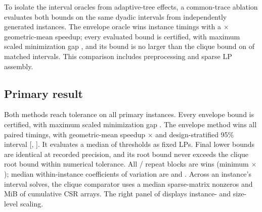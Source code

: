 \documentclass[11pt]{article}
\theoremstyle{plain}
\theoremstyle{definition}
\theoremstyle{remark}
\begin{document}
To isolate the interval oracles from adaptive-tree effects, a common-trace ablation evaluates both bounds on the same \PubTraceIntervals{} dyadic intervals from \PubTraceCases{} independently generated instances.  The envelope oracle wins \PubTraceWins{} instance timings with a \PubTraceGeoSpeedup$\times$ geometric-mean speedup; every evaluated bound is certified, with maximum scaled minimization gap \PubTraceCertGap, and its bound is no larger than the clique bound on \PubTraceDominancePct{} of matched intervals.  This comparison includes preprocessing and sparse LP assembly.

\begin{table}[t]
\centering
\caption{Kernel ablation against dense threshold materialization.  Speedups are geometric means over four families and three seeds.  Storage is the median (maximum) ratio of persistent numerical-array bytes and excludes interpreter overhead.}
\label{tab:kernel}
\small

\end{table}

\subsection{Primary result}

Both methods reach tolerance on all \PubPrimaryCases{} primary instances.  Every envelope bound is certified, with maximum scaled minimization gap \PubPrimaryCertGap.  The envelope method wins all \PubPrimaryWins{} paired timings, with geometric-mean speedup \PubPrimaryGeoSpeedup$\times$ and design-stratified 95\% interval [\PubPrimaryCILow, \PubPrimaryCIHigh].  It evaluates a median \PubPrimaryMedianThetaPct{} of thresholds as fixed LPs.  Final lower bounds are identical at recorded precision, and its root bound never exceeds the clique root bound within numerical tolerance.  All \PubRepeatWins{}/\PubRepeatBlocks{} repeat blocks are wins (minimum \PubRepeatMinSpeedup$\times$); median within-instance coefficients of variation are \PubCompressedMedianCV{} and \PubCliqueMedianCV{}.  Across an instance's interval solves, the clique comparator uses a median \PubCliqueMedianNnz{} sparse-matrix nonzeros and \PubCliqueMedianCSRMiB{} MiB of cumulative CSR arrays.  The right panel of  displays instance- and size-level scaling.

\begin{table}[t]
\centering
\caption{Primary end-to-end certificate comparison.  Each reported time and evaluation count is the median across instances of that size after taking the within-instance median over five balanced timing repetitions.  Aggregate speedup treats each instance once.  C and Q denote the compressed and clique certificates.}
\label{tab:primary}
\small
\resizebox{\textwidth}{!}{}
\end{table}
\end{document}

